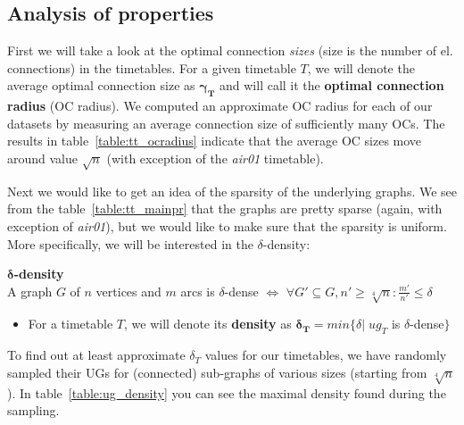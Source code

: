 \subsection{Analysis of properties}

	\noindent First we will take a look at the optimal connection \textit{sizes} (size is the number of el. connections) in the timetables. For a given timetable $T$, we will denote the average optimal connection size as $\bm{\gamma_{T}}$ and will call it the \textbf{optimal connection radius} (OC radius). We computed an approximate OC radius for each of our datasets by measuring an average connection size of sufficiently many OCs. The results in  table~\ref{table:tt_ocradius} indicate that the average OC sizes move around value $\sqrt{n}$ (with exception of the \textit{air01} timetable).
	
	Next we would like to get an idea of the sparsity of the underlying graphs. We see from the table~\ref{table:tt_mainpr} that the graphs are pretty sparse (again, with exception of \textit{air01}), but we would like to make sure that the sparsity is uniform. More specifically, we will be interested in the $\delta$-density:
	
	\begin{definition}
		\textbf{$\bm{\delta}$-density} \\
		A graph $G$ of $n$ vertices and $m$ arcs is $\delta$-dense $\iff$ $\forall G' \subseteq G, n' \geq \sqrt[4]{n}: \frac{\displaystyle m'}{\displaystyle n'} \leq \delta$
		\begin{itemize}
			\item For a timetable $T$, we will denote its \textbf{density} as $\bm{\delta_{T}} = min \{\delta|\; ug_{T}$ is $\delta$-dense$\}$
		\end{itemize}
	\end{definition}
	
	\noindent To find out at least approximate $\delta_{T}$ values for our timetables, we have randomly sampled their UGs for (connected) sub-graphs of various sizes (starting from $\sqrt[4]{n}$). In table~\ref{table:ug_density} you can see the maximal density found during the sampling. \\
	
